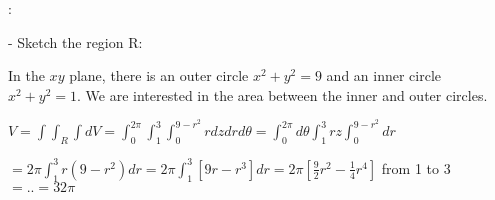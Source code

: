 \documentclass[12pt]{article}
\begin{document}
	: 
	\vspace{20pt}
	
	\noindent - Sketch the region R:
	
	\noindent In the $xy$ plane, there is an outer circle $x^2+y^2=9$ and an inner circle $x^2+y^2=1$. We are interested in the area between the inner and outer circles.
	
	\vspace{20pt}
	
	\noindent $V = \int\int_R\int dV = \int_0^{2\pi}\int_1^3\int_0^{9-r^2} rdzdrd\theta = \int_0^{2\pi}d\theta\int_1^3rz\int_0^{9-r^2} dr$ 
	
	\vspace{10pt}
	
	\noindent $= 2\pi \int_1^3r(9-r^2)dr = 2\pi\int_1^3[9r-r^3]dr = 2\pi[\frac{9}{2}r^2-\frac{1}{4}r^4]$ from 1 to 3 $=..=32\pi$
	\vspace{10pt}
	
	
	
\end{document}
